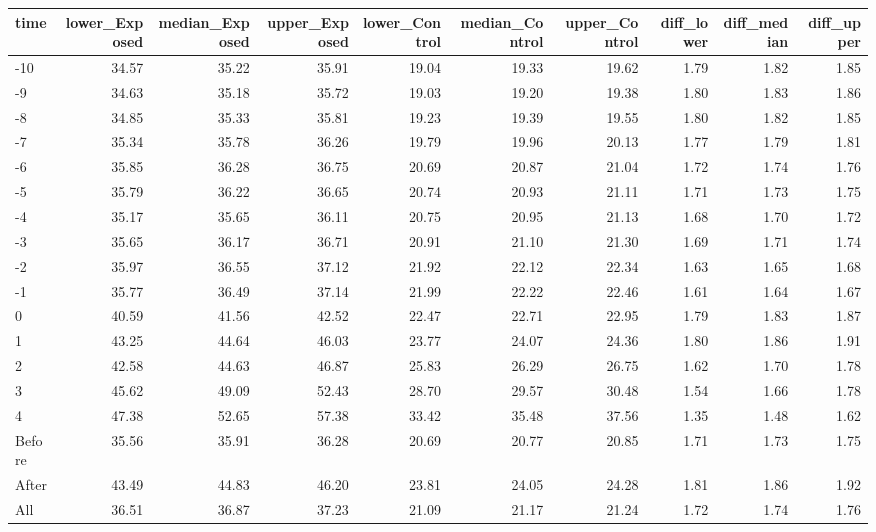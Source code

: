\begin{table}[ht]
\centering
\begin{tabular}{lrrrrrrrrr}
  \hline
time & lower\_Exposed & median\_Exposed & upper\_Exposed & lower\_Control & median\_Control & upper\_Control & diff\_lower & diff\_median & diff\_upper \\ 
  \hline
-10 & 34.57 & 35.22 & 35.91 & 19.04 & 19.33 & 19.62 & 1.79 & 1.82 & 1.85 \\ 
  -9 & 34.63 & 35.18 & 35.72 & 19.03 & 19.20 & 19.38 & 1.80 & 1.83 & 1.86 \\ 
  -8 & 34.85 & 35.33 & 35.81 & 19.23 & 19.39 & 19.55 & 1.80 & 1.82 & 1.85 \\ 
  -7 & 35.34 & 35.78 & 36.26 & 19.79 & 19.96 & 20.13 & 1.77 & 1.79 & 1.81 \\ 
  -6 & 35.85 & 36.28 & 36.75 & 20.69 & 20.87 & 21.04 & 1.72 & 1.74 & 1.76 \\ 
  -5 & 35.79 & 36.22 & 36.65 & 20.74 & 20.93 & 21.11 & 1.71 & 1.73 & 1.75 \\ 
  -4 & 35.17 & 35.65 & 36.11 & 20.75 & 20.95 & 21.13 & 1.68 & 1.70 & 1.72 \\ 
  -3 & 35.65 & 36.17 & 36.71 & 20.91 & 21.10 & 21.30 & 1.69 & 1.71 & 1.74 \\ 
  -2 & 35.97 & 36.55 & 37.12 & 21.92 & 22.12 & 22.34 & 1.63 & 1.65 & 1.68 \\ 
  -1 & 35.77 & 36.49 & 37.14 & 21.99 & 22.22 & 22.46 & 1.61 & 1.64 & 1.67 \\ 
  0 & 40.59 & 41.56 & 42.52 & 22.47 & 22.71 & 22.95 & 1.79 & 1.83 & 1.87 \\ 
  1 & 43.25 & 44.64 & 46.03 & 23.77 & 24.07 & 24.36 & 1.80 & 1.86 & 1.91 \\ 
  2 & 42.58 & 44.63 & 46.87 & 25.83 & 26.29 & 26.75 & 1.62 & 1.70 & 1.78 \\ 
  3 & 45.62 & 49.09 & 52.43 & 28.70 & 29.57 & 30.48 & 1.54 & 1.66 & 1.78 \\ 
  4 & 47.38 & 52.65 & 57.38 & 33.42 & 35.48 & 37.56 & 1.35 & 1.48 & 1.62 \\ 
  Before & 35.56 & 35.91 & 36.28 & 20.69 & 20.77 & 20.85 & 1.71 & 1.73 & 1.75 \\ 
  After & 43.49 & 44.83 & 46.20 & 23.81 & 24.05 & 24.28 & 1.81 & 1.86 & 1.92 \\ 
  All & 36.51 & 36.87 & 37.23 & 21.09 & 21.17 & 21.24 & 1.72 & 1.74 & 1.76 \\ 
   \hline
\end{tabular}
\end{table}
